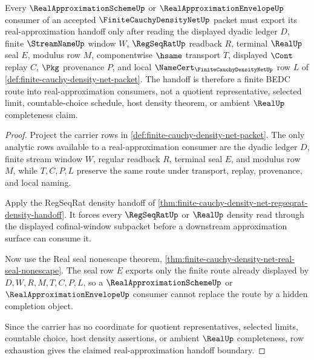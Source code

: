 \begin{theorem}
\label{thm:finite-cauchy-density-net-regular-approximation-handoff}
Every $\RealApproximationSchemeUp$ or $\RealApproximationEnvelopeUp$ consumer of an accepted $\FiniteCauchyDensityNetUp$ packet must export its real-approximation handoff only after reading the displayed dyadic ledger $D$, finite $\StreamNameUp$ window $W$, $\RegSeqRatUp$ readback $R$, terminal $\RealUp$ seal $E$, modulus row $M$, componentwise $\hsame$ transport $T$, displayed $\Cont$ replay $C$, $\Pkg$ provenance $P$, and local $\NameCert_{\FiniteCauchyDensityNetUp}$ row $L$ of \autoref{def:finite-cauchy-density-net-packet}. The handoff is therefore a finite BEDC route into real-approximation consumers, not a quotient representative, selected limit, countable-choice schedule, host density theorem, or ambient $\RealUp$ completeness claim.
\end{theorem}
\begin{proof}
Project the carrier rows in \autoref{def:finite-cauchy-density-net-packet}. The only analytic rows available to a real-approximation consumer are the dyadic ledger $D$, finite stream window $W$, regular readback $R$, terminal seal $E$, and modulus row $M$, while $T,C,P,L$ preserve the same route under transport, replay, provenance, and local naming.

Apply the RegSeqRat density handoff of \autoref{thm:finite-cauchy-density-net-regseqrat-density-handoff}. It forces every $\RegSeqRatUp$ or $\RealUp$ density read through the displayed cofinal-window subpacket before a downstream approximation surface can consume it.

Now use the Real seal nonescape theorem, \autoref{thm:finite-cauchy-density-net-real-seal-nonescape}. The seal row $E$ exports only the finite route already displayed by $D,W,R,M,T,C,P,L$, so a $\RealApproximationSchemeUp$ or $\RealApproximationEnvelopeUp$ consumer cannot replace the route by a hidden completion object.

Since the carrier has no coordinate for quotient representatives, selected limits, countable choice, host density assertions, or ambient $\RealUp$ completeness, row exhaustion gives the claimed real-approximation handoff boundary.
\end{proof}

